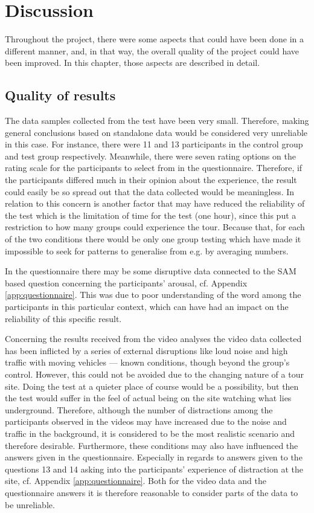 \chapter{Discussion}\label{ch:discussion}
Throughout the project, there were some aspects that could have been done in a different manner, and, in that way, the overall quality of the project could have been improved. In this chapter, those aspects are described in detail.

\section{Quality of results}
The data samples collected from the test have been very small. Therefore, making general conclusions based on standalone data would be considered very unreliable in this case. For instance, there were 11 and 13 participants in the control group and test group respectively. Meanwhile, there were seven rating options on the rating scale for the participants to select from in the questionnaire. Therefore, if the participants differed much in their opinion about the experience, the result could easily be so spread out that the data collected would be meaningless. In relation to this concern is another factor that may have reduced the reliability of the test which is the limitation of time for the test (one hour), since this put a restriction to how many groups could experience the tour. Because that, for each of the two conditions there would be only one group testing which have made it impossible to seek for patterns to generalise from e.g. by averaging numbers.

In the questionnaire there may be some disruptive data connected to the SAM based question concerning the participants’ arousal, cf. Appendix \ref{app:questionnaire}. This was due to poor understanding of the word among the participants in this particular context, which can have had an impact on the reliability of this specific result.

Concerning the results received from the video analyses the video data collected has been inflicted by a series of external disruptions like loud noise and high traffic with moving vehicles --- known conditions, though beyond the group’s control. However, this could not be avoided due to the changing nature of a tour site. Doing the test at a quieter place of course would be a possibility, but then the test would suffer in the feel of actual being on the site watching what lies underground. Therefore, although the number of distractions among the participants observed in the videos may have increased due to the noise and traffic in the background, it is considered to be the most realistic scenario and therefore desirable. Furthermore, these conditions may also have influenced the answers given in the questionnaire. Especially in regards to answers given to the questions 13 and 14 asking into the participants’ experience of distraction at the site, cf. Appendix \ref{app:questionnaire}.
Both for the video data and the questionnaire answers it is therefore reasonable to consider parts of the data to be unreliable. 

